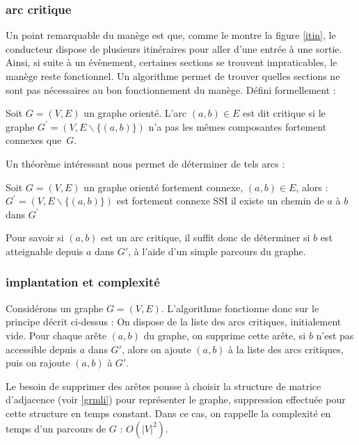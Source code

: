 \documentclass[11pt]{article}
\begin{document}
		\subsubsection{arc critique}
	Un point remarquable du manège est que, comme le montre la figure \ref{itin}, le conducteur dispose de plusieurs itinéraires pour aller d'une entrée à une sortie. Ainsi, si suite à un évènement, certaines sections se trouvent impraticables, le manège reste fonctionnel. Un algorithme permet de trouver quelles sections ne sont pas nécessaires au bon fonctionnement du manège. Défini formellement :
\begin{defin}
	Soit $G = (V,E)$ un graphe orienté. L'arc $(a,b) \in E$ est dit critique si le graphe $G^\prime = (V,E\backslash \{(a,b)\})$ n'a pas les mêmes composantes fortement connexes que~$G$.
\end{defin}
Un théorème intéressant nous permet de déterminer de tels arcs : 
\begin{theo}
		Soit $G=(V,E)$ un graphe orienté fortement connexe, $(a,b) \in E$, alors :
		$G^\prime = (V,E\backslash \{ (a,b) \})$ est fortement connexe SSI il existe un chemin de $a$ à $b$
		dans $G^\prime$
\end{theo}
Pour savoir si $(a,b)$ est un arc critique, il suffit donc de déterminer si $b$ est atteignable depuis $a$ dans $G\prime$, à l'aide d'un simple parcours du graphe.
		\subsubsection{implantation et complexité}
	Considérons un graphe $G=(V,E)$. L'algorithme fonctionne donc sur le principe décrit ci-dessus : On dispose de la liste des arcs critiques, initialement vide. Pour chaque arête $(a,b)$ du graphe, on supprime cette arête, si $b$ n'est pas accessible depuis $a$ dans $G\prime$, alors on ajoute $(a,b)$ à la liste des arcs critiques, puis on rajoute $(a,b)$ à $G\prime$.\par 
Le besoin de supprimer des arêtes pousse à choisir la structure de matrice d'adjacence (voir \ref{grmli}) pour représenter le graphe, suppression effectuée pour cette structure en temps constant. Dans ce cas, on rappelle la complexité en temps d'un parcours de $G$ : $O(|V|^2)$. \par 
\end{document}

